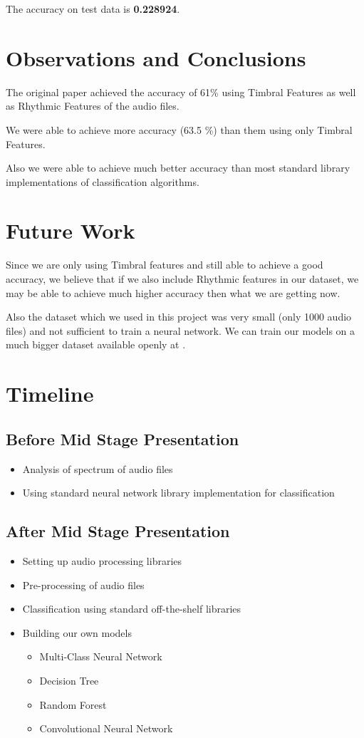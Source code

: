 \documentclass[a4paper,10pt]{article}
\begin{document}
The accuracy on test data is \textbf{0.228924}.

\section{Observations and Conclusions}
The original paper \cite{GTZAN} achieved the accuracy of 61\% using Timbral Features as well as Rhythmic Features of the audio files.

We were able to achieve more accuracy (63.5 \%) than them using only Timbral Features.

Also we were able to achieve much better accuracy than most standard library implementations of classification algorithms.

\section{Future Work}
Since we are only using Timbral features and still able to achieve a good accuracy, we believe that if we also include Rhythmic features in our dataset, we may be able to achieve much higher accuracy then what we are getting now.

Also the dataset which we used in this project was very small (only 1000 audio files) and not sufficient to train a neural network. We can train our models on a much bigger dataset available openly at \cite{Bertin-Mahieux2011}.

\section{Timeline}
\subsection{Before Mid Stage Presentation}
\begin{itemize}
 \item Analysis of spectrum of audio files
 \item Using standard neural network library implementation for classification
\end{itemize}
\subsection{After Mid Stage Presentation}
\begin{itemize}
 \item Setting up audio processing libraries
 \item Pre-processing of audio files
 \item Classification using standard off-the-shelf libraries
 \item Building our own models
 \begin{itemize}
  \item Multi-Class Neural Network
  \item Decision Tree
  \item Random Forest
  \item Convolutional Neural Network
 \end{itemize}
\end{itemize}
\end{document}
